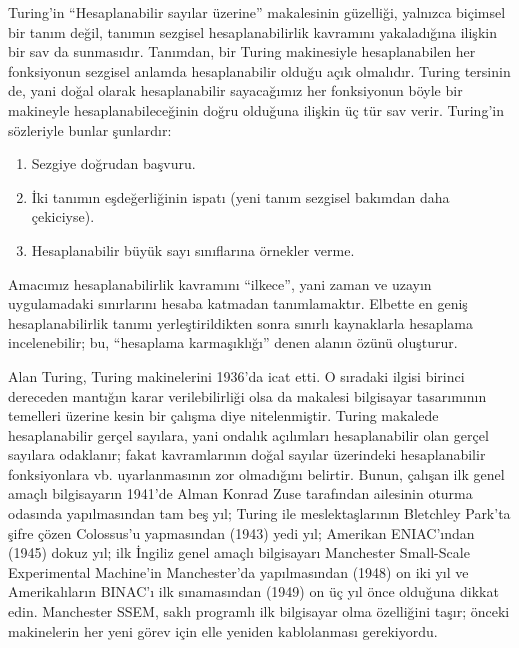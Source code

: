 \begin{digress}
Turing'in ``Hesaplanabilir sayılar üzerine'' makalesinin güzelliği, yalnızca
biçimsel bir tanım değil, tanımın sezgisel hesaplanabilirlik kavramını
yakaladığına ilişkin bir sav da sunmasıdır. Tanımdan, bir Turing makinesiyle
hesaplanabilen her fonksiyonun sezgisel anlamda hesaplanabilir olduğu açık
olmalıdır. Turing tersinin de, yani doğal olarak hesaplanabilir sayacağımız
her fonksiyonun böyle bir makineyle hesaplanabileceğinin doğru olduğuna
ilişkin üç tür sav verir. Turing'in sözleriyle bunlar şunlardır:
\begin{enumerate}
\item Sezgiye doğrudan başvuru.
\item İki tanımın eşdeğerliğinin ispatı (yeni tanım sezgisel bakımdan daha
  çekiciyse).
\item Hesaplanabilir büyük sayı sınıflarına örnekler verme.
\end{enumerate}
Amacımız hesaplanabilirlik kavramını ``ilkece'', yani zaman ve uzayın
uygulamadaki sınırlarını hesaba katmadan tanımlamaktır. Elbette en geniş
hesaplanabilirlik tanımı yerleştirildikten sonra sınırlı kaynaklarla hesaplama
incelenebilir; bu, ``hesaplama karmaşıklığı'' denen alanın özünü oluşturur.
\end{digress}

\begin{history}
Alan Turing, Turing makinelerini 1936'da icat etti. O sıradaki ilgisi birinci
dereceden mantığın karar verilebilirliği olsa da makalesi bilgisayar tasarımının
temelleri üzerine kesin bir çalışma diye nitelenmiştir. Turing makalede
hesaplanabilir gerçel sayılara, yani ondalık açılımları hesaplanabilir olan
gerçel sayılara odaklanır; fakat kavramlarının doğal sayılar üzerindeki
hesaplanabilir fonksiyonlara vb. uyarlanmasının zor olmadığını belirtir.
Bunun, çalışan ilk genel amaçlı bilgisayarın 1941'de Alman Konrad Zuse
tarafından ailesinin oturma odasında yapılmasından tam beş yıl; Turing ile
meslektaşlarının Bletchley Park'ta şifre çözen Colossus'u yapmasından (1943)
yedi yıl; Amerikan ENIAC'ından (1945) dokuz yıl; ilk İngiliz genel amaçlı
bilgisayarı Manchester Small-Scale Experimental Machine'in Manchester'da
yapılmasından (1948) on iki yıl ve Amerikalıların BINAC'ı ilk sınamasından
(1949) on üç yıl önce olduğuna dikkat edin. Manchester SSEM, saklı programlı
ilk bilgisayar olma özelliğini taşır; önceki makinelerin her yeni görev için
elle yeniden kablolanması gerekiyordu.
\end{history}

